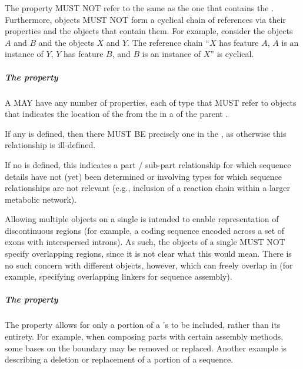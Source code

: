 The  property MUST NOT refer to the same  as the one that contains the .
Furthermore,  objects MUST NOT form a cyclical chain of references via their  properties and the  objects that contain them.
For example, consider the  objects $A$ and $B$ and the  objects $X$ and $Y$. The reference chain ``$X$ has feature $A$, $A$ is an instance of $Y$, $Y$ has feature $B$, and $B$ is an instance of $X$'' is cyclical.


\subparagraph{The  property}\label{sec:hasLocation:SC}

A  MAY have any number of  properties, each of type  that MUST refer to  objects that indicates the location of the  from the   in a  of the parent .

If any  is defined, then there MUST BE precisely one  in the  , as otherwise this relationship is ill-defined.

If no  is defined, this indicates a part / sub-part relationship for which sequence details have not (yet) been determined or involving types for which sequence relationships are not relevant (e.g., inclusion of a reaction chain within a larger metabolic network).

Allowing multiple  objects on a single  is intended to enable representation of discontinuous regions (for example, a coding sequence encoded across a set of exons with interspersed introns).
As such, the  objects of a single  MUST NOT specify overlapping regions, since it is not clear what this would mean.
There is no such concern with different objects, however, which can freely overlap in  (for example, specifying overlapping linkers for sequence assembly).


\subparagraph{The  property}\label{sec:sourceLocation}

The  property allows for only a portion of a 's  to be included, rather than its entirety.
For example, when composing parts with certain assembly methods, some bases on the boundary may be removed or replaced.
Another example is describing a deletion or replacement of a portion of a sequence.

